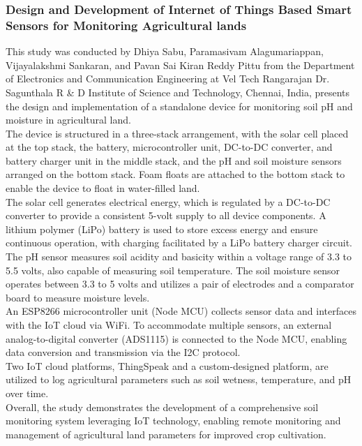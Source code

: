 \documentclass[12pt, a4paper]{article}
\begin{document}
\subsubsection{Design and Development of Internet of Things Based Smart Sensors for Monitoring Agricultural lands}
This study was conducted by Dhiya Sabu, Paramasivam Alagumariappan, Vijayalakshmi Sankaran, and Pavan Sai Kiran Reddy Pittu  \cite{sabu2023design} from the Department of Electronics and Communication Engineering at Vel Tech Rangarajan Dr. Sagunthala R & D Institute of Science and Technology, Chennai, India, presents the design and implementation of a standalone device for monitoring soil pH and moisture in agricultural land.\\
The device is structured in a three-stack arrangement, with the solar cell placed at the top stack, the battery, microcontroller unit, DC-to-DC converter, and battery charger unit in the middle stack, and the pH and soil moisture sensors arranged on the bottom stack. Foam floats are attached to the bottom stack to enable the device to float in water-filled land.\\
The solar cell generates electrical energy, which is regulated by a DC-to-DC converter to provide a consistent 5-volt supply to all device components. A lithium polymer (LiPo) battery is used to store excess energy and ensure continuous operation, with charging facilitated by a LiPo battery charger circuit.\\
The pH sensor measures soil acidity and basicity within a voltage range of 3.3 to 5.5 volts, also capable of measuring soil temperature. The soil moisture sensor operates between 3.3 to 5 volts and utilizes a pair of electrodes and a comparator board to measure moisture levels.\\
An ESP8266 microcontroller unit (Node MCU) collects sensor data and interfaces with the IoT cloud via WiFi. To accommodate multiple sensors, an external analog-to-digital converter (ADS1115) is connected to the Node MCU, enabling data conversion and transmission via the I2C protocol.\\
Two IoT cloud platforms, ThingSpeak and a custom-designed platform, are utilized to log agricultural parameters such as soil wetness, temperature, and pH over time.\\
Overall, the study demonstrates the development of a comprehensive soil monitoring system leveraging IoT technology, enabling remote monitoring and management of agricultural land parameters for improved crop cultivation.
\end{document}
